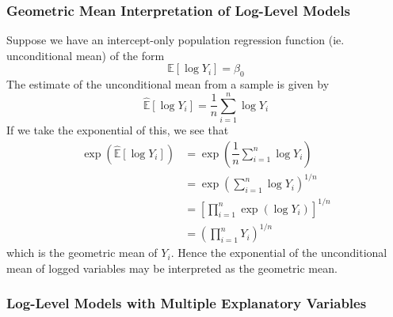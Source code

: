 \documentclass[11pt]{report} %
\begin{document}
\subsubsection{Geometric Mean Interpretation of Log-Level Models}

Suppose we have an intercept-only population regression function (ie. unconditional mean) of the form
\begin{equation}
\mathbb{E}\left[\log Y_{i}\right] = \beta_{0}
\end{equation}
The estimate of the unconditional mean from a sample is given by
\begin{equation}
\widehat{\mathbb{E}}\left[\log Y_{i}\right] = \dfrac{1}{n}\sum_{i = 1}^{n}\log Y_{i}
\end{equation}
If we take the exponential of this, we see that
\begin{align}
\exp\left(\widehat{\mathbb{E}}\left[\log Y_{i}\right]\right) &= \exp\left(\dfrac{1}{n}\sum_{i = 1}^{n}\log Y_{i}\right) \\
&= \exp\left(\sum_{i = 1}^{n}\log Y_{i}\right)^{1/n} \\
&= \left[\prod_{i = 1}^{n}\exp\left(\log Y_{i}\right)\right]^{1/n} \\
&= \left(\prod_{i = 1}^{n}Y_{i}\right)^{1/n}
\end{align}
which is the geometric mean of $Y_{i}$. Hence the exponential of the unconditional mean of logged variables may be interpreted as the geometric mean.

\subsubsection{Log-Level Models with Multiple Explanatory Variables}
\end{document}
